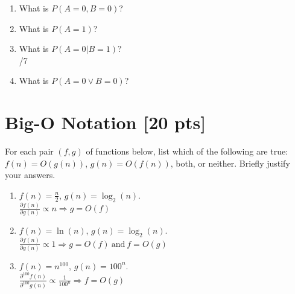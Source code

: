 \documentclass[a4paper]{article}
\theoremstyle{definition}
\newenvironment{soln}{
    \leavevmode\color{blue}\ignorespaces
}{}
\begin{document}
\begin{enumerate}
\begin{table}[htb]
\end{table}
\begin{enumerate}
	\item 	What is $P(A = 0, B = 0)$?\\
	    \begin{soln}  0.1 \end{soln}
	\item 	What is $P(A = 1)$?\\
	    \begin{soln}  0.5 \end{soln}
	\item 	What is $P(A = 0 | B = 1)$?\\
	    \begin{soln}  4/7 \end{soln}
	\item 	What is $P(A = 0 \vee B = 0 )$?\\
	    \begin{soln}  0.7 \end{soln}
\end{enumerate}
\end{enumerate}


\section{Big-O Notation [20 pts]}
For each pair $(f, g)$ of functions below, list which of the following
are true: $f(n) = O(g(n))$, $g(n) = O(f(n))$, both, or
neither. Briefly justify your answers.
\begin{enumerate}
	\item 	$f(n) = \frac{n}{2}$, $g(n) = \log_{2}(n)$.\\
	    \begin{soln} $ \frac{\partial f(n)}{\partial g(n)} \propto n\Longrightarrow g=O(f)$\end{soln}
	\item 	$f(n) = \ln(n)$, $g(n) = \log_{2}(n)$.\\
	    \begin{soln}  $ \frac{\partial f(n)}{\partial g(n)} \propto 1\Longrightarrow g=O(f)\ \text{and}\ f=O(g)$ \end{soln}
	\item 	$f(n) = n^{100}$, $g(n) = 100^n$.\\
	    \begin{soln}  $ \frac{\partial^{100} f(n)}{\partial^{100} g(n)} \propto \frac{1}{100^n}\Longrightarrow f=O(g)$ \end{soln}
\end{enumerate}
\end{document}
